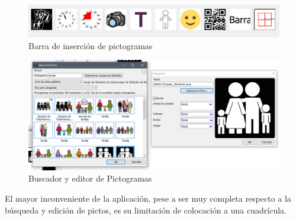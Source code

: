 \begin{figure}[h!]
	\centering
	\includegraphics[width=0.7\linewidth]{Imagenes/Bitmap/Ribbon Pictoselector}
	\caption{Barra de inserción de pictogramas}
	\label{fig:ribbon-pictoselector}
\end{figure}

\begin{figure}[h!]
	\centering
	\includegraphics[width=0.7\linewidth]{Imagenes/Bitmap/Editor y buscador de pictoselector}
	\caption{Buscador y editor de Pictogramas}
	\label{fig:editor-y-buscador-de-pictoselector}
\end{figure}




El mayor inconveniente de la aplicación, pese a ser muy completa respecto a la búsqueda y edición de pictos, es su limitación de colocación a una cuadrícula.

